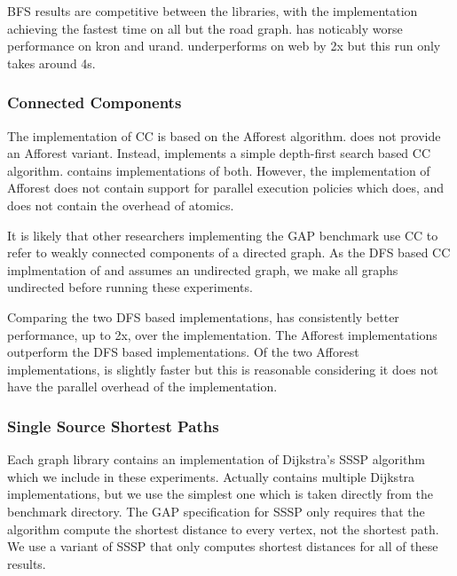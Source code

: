
BFS results are competitive between the libraries, with the \stdgraph implementation achieving the fastest time on all but the road graph.
\nwgraph has noticably worse performance on kron and urand.
\bgl underperforms on web by 2x but this run only takes around 4s.

\subsubsection{Connected Components}
The \nwgraph implementation of CC is based on the Afforest \cite{sutton2018optimizing} algorithm.
\bgl does not provide an Afforest variant.
Instead, \bgl implements a simple depth-first search based CC algorithm.
\stdgraph contains implementations of both.
However, the \stdgraph implementation of Afforest does not contain support for parallel execution
policies which \nwgraph does, and does not contain the overhead of atomics.

It is likely that other researchers implementing the GAP benchmark use CC to refer
to weakly connected components of a directed graph.
As the DFS based CC implmentation of \bgl and \stdgraph assumes an undirected graph,
we make all graphs undirected before running these experiments.

Comparing the two DFS based implementations, \stdgraph has consistently better performance, up to 2x, over the \bgl implementation.
The Afforest implementations outperform the DFS based implementations.
Of the two Afforest implementations, \stdgraph is slightly faster but this is reasonable considering
it does not have the parallel overhead of the \nwgraph implementation.

\subsubsection{Single Source Shortest Paths}
Each graph library contains an implementation of Dijkstra's SSSP algorithm which
we include in these experiments.
Actually \nwgraph contains multiple Dijkstra implementations, but we use the simplest one which
is taken directly from the \nwgraph benchmark directory.
The GAP specification for SSSP only requires that the algorithm compute the shortest distance
to every vertex, not the shortest path.
We use a variant of SSSP that only computes shortest distances for all of these results.

